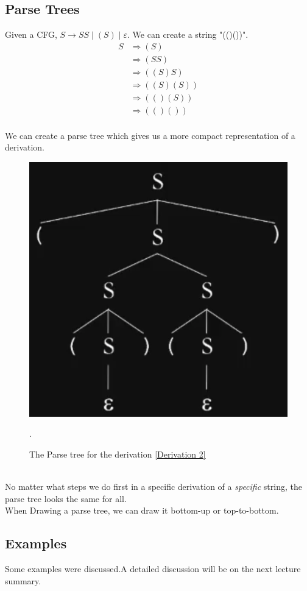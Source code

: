 \documentclass{article}
\begin{document}
    \subsection*{Parse Trees}
    Given a CFG, $S\to SS\;|\;(S)\;|\;\varepsilon$. We can create a string "(()())".
    \begin{equation}
        \begin{aligned}
            S&\Rightarrow (S)\\
            &\Rightarrow (SS)\\
            &\Rightarrow ((S)S)\\
            &\Rightarrow ((S)(S))\\
            &\Rightarrow (()(S))\\
            &\Rightarrow (()())
        \end{aligned}
        \label{Derivation 2}
    \end{equation}
    \\
    We can create a parse tree which gives us a more compact representation of a derivation.
    \begin{figure}[h]
        \centerline{
            \includegraphics[scale=0.25]{Parse Tree.png}
        }
        \caption{The Parse tree for the derivation \ref{Derivation 2}}.
        \label{ParseTree1}
    \end{figure}
    \\
    No matter what steps we do first in a specific derivation of a \emph{specific} string, the parse tree looks the same for all.\\
    When Drawing a parse tree, we can draw it bottom-up or top-to-bottom.

    \subsection*{Examples}
    Some examples were discussed.A detailed discussion will be on the next lecture summary.
\end{document}
